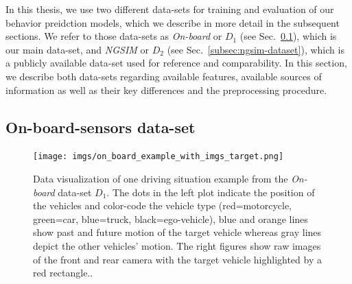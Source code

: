 In this thesis, we use two different data-sets for training and evaluation of our behavior preidction models, which we describe in more detail in the subsequent sections.
We refer to those data-sets as \emph{On-board} or $D_1$ (see Sec.~\ref{subsec:onboard-dataset}), which is our main data-set, and \emph{\acs{NGSIM}} or $D_2$ (see Sec.~\ref{subsec:ngsim-dataset}), which is a publicly available data-set used for reference and comparability.
In this section, we describe both data-sets regarding available features, available sources of information as well as their key differences and the preprocessing procedure.

\subsection{On-board-sensors data-set}
\label{subsec:onboard-dataset}

\begin{figure}[t!]
	\centering
	\texttt{[image: imgs/on\_board\_example\_with\_imgs\_target.png]}
    \caption{Data visualization of one driving situation example from the \emph{On-board} data-set $D_1$. The dots in the left plot indicate the position of the vehicles and color-code the vehicle type (red=motorcycle, green=car, blue=truck, black=ego-vehicle), blue and orange lines show past and future motion of the target vehicle whereas gray lines depict the other vehicles' motion. The right figures show raw images of the front and rear camera with the target vehicle
    highlighted by a red rectangle..}\label{fig:on_board_data_example}
\end{figure}

